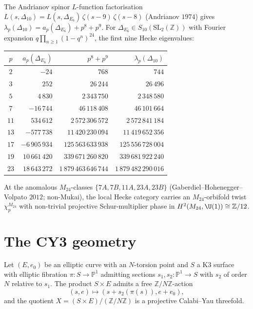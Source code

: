\begin{proposition}
\label{prop:k3e-arthur-hecke-eigenvalues}
The Andrianov spinor $L$-function factorisation $L(s,\Delta_{10}) = L(s,\Delta_{E_6})\,\zeta(s-9)\,\zeta(s-8)$ (Andrianov $1974$) gives $\lambda_p(\Delta_{10}) = a_p(\Delta_{E_6}) + p^8 + p^9$. For $\Delta_{E_6}\in S_{10}(\mathrm{SL}_2(\mathbb{Z}))$ with Fourier expansion $q\prod_{n\ge 1}(1-q^n)^{24}$, the first nine Hecke eigenvalues:
\begin{center}
\renewcommand{\arraystretch}{1.25}
\begin{tabular}{|c|r|r|r|}
\hline
$p$ & $a_p(\Delta_{E_6})$ & $p^8 + p^9$ & $\lambda_p(\Delta_{10})$ \\
\hline
$2$ & $-24$ & $768$ & $744$ \\
\hline
$3$ & $252$ & $26\,244$ & $26\,496$ \\
\hline
$5$ & $4\,830$ & $2\,343\,750$ & $2\,348\,580$ \\
\hline
$7$ & $-16\,744$ & $46\,118\,408$ & $46\,101\,664$ \\
\hline
$11$ & $534\,612$ & $2\,572\,306\,572$ & $2\,572\,841\,184$ \\
\hline
$13$ & $-577\,738$ & $11\,420\,230\,094$ & $11\,419\,652\,356$ \\
\hline
$17$ & $-6\,905\,934$ & $125\,563\,633\,938$ & $125\,556\,728\,004$ \\
\hline
$19$ & $10\,661\,420$ & $339\,671\,260\,820$ & $339\,681\,922\,240$ \\
\hline
$23$ & $18\,643\,272$ & $1\,879\,463\,646\,744$ & $1\,879\,482\,290\,016$ \\
\hline
\end{tabular}
\end{center}
At the anomalous $M_{24}$-classes $\{7A, 7B, 11A, 23A, 23B\}$ (Gaberdiel--Hohenegger--Volpato $2012$; non-Mukai), the local Hecke category carries an $M_{24}$-orbifold twist $\chi^{M_{24}}_p$ with non-trivial projective Schur-multiplier phase in $H^2(M_{24},\U(1))\cong\mathbb{Z}/12$.
\end{proposition}


\section{The CY3 geometry}
\label{sec:k3e-geometry}

Let $(E, e_0)$ be an elliptic curve with an $N$-torsion point and $S$ a K3 surface with elliptic fibration $\pi \colon S \to \mathbb{P}^1$ admitting sections $s_1, s_2 \colon \mathbb{P}^1 \to S$ with $s_2$ of order $N$ relative to $s_1$. The product $S \times E$ admits a free $\mathbb{Z}/N\mathbb{Z}$-action
\[
 (s, e) \longmapsto (s + s_2(\pi(s)), e + e_0),
\]
and the quotient $X = (S \times E)/(\mathbb{Z}/N\mathbb{Z})$ is a projective Calabi--Yau threefold.

